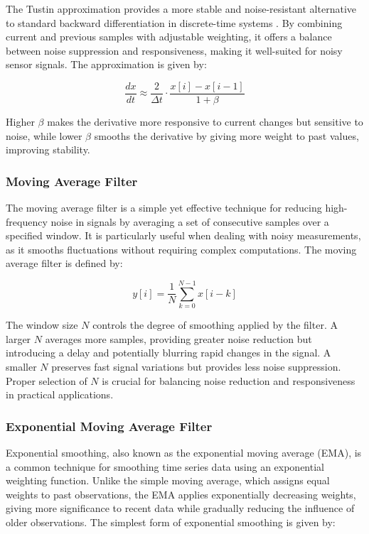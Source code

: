 \documentclass[conference]{IEEEtran}
\begin{document}
The Tustin approximation provides a more stable and noise-resistant alternative to standard backward differentiation in discrete-time systems \cite{ogata2010}. By combining current and previous samples with adjustable weighting, it offers a balance between noise suppression and responsiveness, making it well-suited for noisy sensor signals. The approximation is given by:

\begin{equation}
\frac{dx}{dt} \approx \frac{2}{\Delta t} \cdot \frac{x[i] - x[i-1]}{1 + \beta}
\label{eq:tustin_approximation}
\end{equation}

Higher $\beta$ makes the derivative more responsive to current changes but sensitive to noise, while lower  $\beta$ smooths the derivative by giving more weight to past values, improving stability.

\subsubsection{\textbf{Moving Average Filter}}

The moving average filter is a simple yet effective technique for reducing high-frequency noise in signals by averaging a set of consecutive samples over a specified window. It is particularly useful when dealing with noisy measurements, as it smooths fluctuations without requiring complex computations. The moving average filter is defined by:

\begin{equation}
y[i] = \frac{1}{N} \sum_{k=0}^{N-1} x[i - k]
\label{eq:moving_average}
\end{equation}

The window size \( N \) controls the degree of smoothing applied by the filter. A larger \( N \) averages more samples, providing greater noise reduction but introducing a delay and potentially blurring rapid changes in the signal. A smaller \( N \) preserves fast signal variations but provides less noise suppression. Proper selection of \( N \) is crucial for balancing noise reduction and responsiveness in practical applications.

\subsubsection{\textbf{Exponential Moving Average Filter}}

Exponential smoothing, also known as the exponential moving average (EMA), is a common technique for smoothing time series data using an exponential weighting function. Unlike the simple moving average, which assigns equal weights to past observations, the EMA applies exponentially decreasing weights, giving more significance to recent data while gradually reducing the influence of older observations. The simplest form of exponential smoothing is given by:
\end{document}

